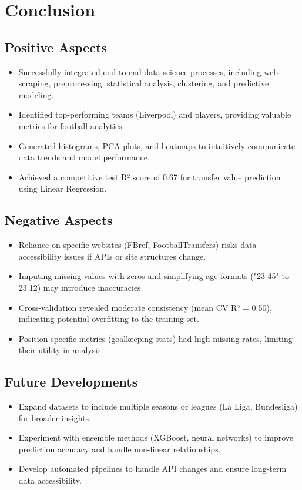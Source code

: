 \documentclass[12pt,a4paper]{report}
\begin{document}
\cleardoublepage  %

\section*{Conclusion}  %

\subsection*{Positive Aspects}
\begin{itemize}
    \item Successfully integrated end-to-end data science processes, including web scraping, preprocessing, statistical analysis, clustering, and predictive modeling.
    \item Identified top-performing teams (Liverpool) and players, providing valuable metrics for football analytics.
    \item Generated histograms, PCA plots, and heatmaps to intuitively communicate data trends and model performance.
    \item Achieved a competitive test R² score of 0.67 for transfer value prediction using Linear Regression.
\end{itemize}

\subsection*{Negative Aspects}
\begin{itemize}
    \item Reliance on specific websites (FBref, FootballTransfers) risks data accessibility issues if APIs or site structures change.
    \item Imputing missing values with zeros and simplifying age formats ("23-45" to 23.12) may introduce inaccuracies.
    \item Cross-validation revealed moderate consistency (mean CV R² = 0.50), indicating potential overfitting to the training set.
    \item Position-specific metrics (goalkeeping stats) had high missing rates, limiting their utility in analysis.
\end{itemize}

\subsection*{Future Developments}
\begin{itemize}
    \item Expand datasets to include multiple seasons or leagues (La Liga, Bundesliga) for broader insights.
    \item Experiment with ensemble methods (XGBoost, neural networks) to improve prediction accuracy and handle non-linear relationships.
    \item Develop automated pipelines to handle API changes and ensure long-term data accessibility.
\end{itemize}
\end{document}
